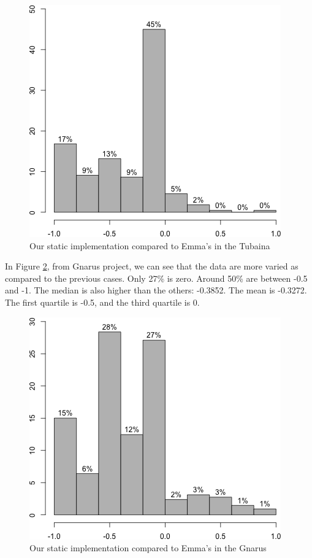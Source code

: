\documentclass{sig-alternate}
\begin{document}
\begin{figure}[h!H]
  \centering
  \includegraphics[scale=0.3]{../stats/tubaina-histograma-gelato.png}
  \caption{Our static implementation compared to Emma's in the Tubaina}
  \label{fig:tubaina}
\end{figure}


In Figure \ref{fig:gnarus}, from Gnarus project, we can see that the data are more varied as 
compared to the previous cases. Only 27\% is zero. Around 50\% are between -0.5 and -1. 
The median is also higher than the others: -0.3852. The mean is -0.3272. The first quartile
is -0.5, and the third quartile is 0.

\begin{figure}[h!H]
  \centering
  \includegraphics[scale=0.3]{../stats/gnarus-histograma-gelato.png}
  \caption{Our static implementation compared to Emma's in the Gnarus}
  \label{fig:gnarus}
\end{figure}
\end{document}
